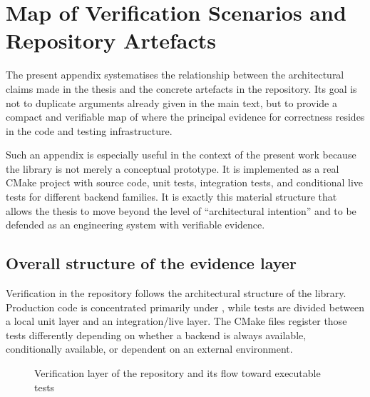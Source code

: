 \section{Map of Verification Scenarios and Repository Artefacts}
\label{sec:verification_appendix}

The present appendix systematises the relationship between the architectural claims made in the thesis and the concrete artefacts in the repository. Its goal is not to duplicate arguments already given in the main text, but to provide a compact and verifiable map of where the principal evidence for correctness resides in the code and testing infrastructure.

Such an appendix is especially useful in the context of the present work because the library is not merely a conceptual prototype. It is implemented as a real CMake project with source code, unit tests, integration tests, and conditional live tests for different backend families. It is exactly this material structure that allows the thesis to move beyond the level of ``architectural intention'' and to be defended as an engineering system with verifiable evidence.

\subsection{Overall structure of the evidence layer}

Verification in the repository follows the architectural structure of the library. Production code is concentrated primarily under , while tests are divided between a local unit layer and an integration/live layer. The CMake files register those tests differently depending on whether a backend is always available, conditionally available, or dependent on an external environment.

\begin{figure}[H]
\centering
{}
\caption{Verification layer of the repository and its flow toward executable tests}
\label{fig:verification_appendix_map}
\end{figure}

